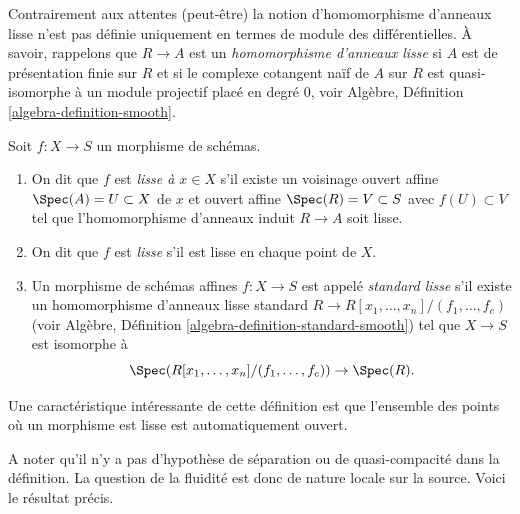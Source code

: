 \medskip\noindent Contrairement
aux attentes (peut-être) la notion d'homomorphisme
d'anneaux lisse n'est pas définie uniquement en termes
de module des différentielles. À savoir, rappelons que $R \to A$
est un {\it homomorphisme d'anneaux lisse} si $A$ est de
présentation finie sur $R$ et si le complexe cotangent naïf de $A$ sur
$R$ est quasi-isomorphe à un module projectif placé
en degré $0$, voir Algèbre, Définition \ref{algebra-definition-smooth}.

\begin{definition}
\label{definition-smooth}
Soit $f : X \to S$ un morphisme de schémas.
\begin{enumerate}
\item On dit que $f$ est {\it lisse
à $x \in X$} s'il existe un voisinage ouvert affine $\Spec(A) = U \subset X$
de $x$ et ouvert affine $\Spec(R) = V \subset S$ avec
$f(U) \subset V$ tel que l'homomorphisme d'anneaux induit $R \to A$
soit lisse.
\item On dit que $f$ est {\it lisse} s'il est lisse en chaque point de $X$.
\item Un morphisme de schémas affines $f : X \to S$
est appelé {\it standard lisse} s'il
existe un homomorphisme d'anneaux lisse standard
$R \to R[x_1, \ldots, x_n]/(f_1, \ldots, f_c)$ (voir Algèbre, Définition \ref{algebra-definition-standard-smooth}) tel
que $X \to S$ est isomorphe à
$$
\Spec(R[x_1, \ldots, x_n]/(f_1, \ldots, f_c)) \to \Spec(R).
$$
\end{enumerate}
\end{definition}

\noindent
Une caractéristique intéressante de cette définition est que l'ensemble des points
où un morphisme est lisse est automatiquement ouvert.

\medskip\noindent
A noter qu'il n'y a pas d'hypothèse de séparation ou de quasi-compacité dans
la définition. La question de la fluidité est donc de nature locale sur
la source. Voici le résultat précis.


